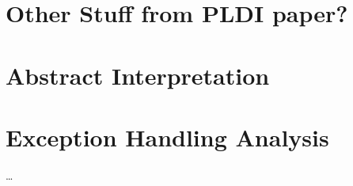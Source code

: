 
\section{Other Stuff from PLDI paper?}

\section{Abstract Interpretation}

\section{Exception Handling Analysis}
\todo\dots

